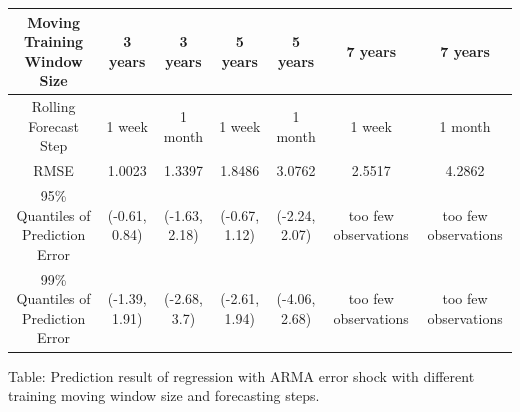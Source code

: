 \begin{table}[h]
\begin{tabular}{|c|c|c|c|c|c|c|}
\hline
\hspace{5pt} Moving Training Window Size & 3 years & 3 years & 5 years & 5 years & 7 years &  7 years \\ \hline
Rolling Forecast Step & 1 week & 1 month & 1 week & 1 month & 1 week & 1 month\\ \hline
RMSE & 1.0023 & 1.3397 & 1.8486 & 3.0762 & 2.5517 & 4.2862\\ \hline
95\% Quantiles of Prediction Error & (-0.61, 0.84) & (-1.63, 2.18) & (-0.67, 1.12) & (-2.24, 2.07) & too few observations & too few observations\\ \hline
99\% Quantiles of Prediction Error & (-1.39, 1.91) & (-2.68, 3.7) & (-2.61, 1.94) & (-4.06, 2.68) & too few observations & too few observations\\ \hline
\end{tabular}
\label{table:time series prediction results}
\end{table}
Table: Prediction result of regression with ARMA error shock with different training moving window size and forecasting steps.

